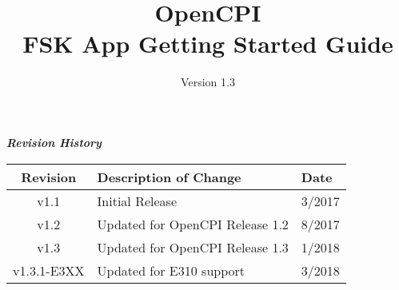 \iffalse
This file is protected by Copyright. Please refer to the COPYRIGHT file
distributed with this source distribution.

This file is part of OpenCPI <http://www.opencpi.org>

OpenCPI is free software: you can redistribute it and/or modify it under the
terms of the GNU Lesser General Public License as published by the Free Software
Foundation, either version 3 of the License, or (at your option) any later
version.

OpenCPI is distributed in the hope that it will be useful, but WITHOUT ANY
WARRANTY; without even the implied warranty of MERCHANTABILITY or FITNESS FOR A
PARTICULAR PURPOSE. See the GNU Lesser General Public License for more details.

You should have received a copy of the GNU Lesser General Public License along
with this program. If not, see <http://www.gnu.org/licenses/>.
\fi

\def\docTitle{OpenCPI\\ FSK App Getting Started Guide}
\def\docVersion{1.3}

\date{Version \docVersion} %
\title{\docTitle}
\usepackage[T1]{fontenc} %
\usepackage{graphicx}
\graphicspath{ {figures/} }
\usepackage{textcomp}

\maketitle
\newpage

	\begin{center}
	\textit{\textbf{Revision History}}
		\begin{table}[H]
		\label{table:revisions} %
			\begin{tabularx}{\textwidth}{|c|X|l|}
			\hline
			\rowcolor{blue}
			\textbf{Revision} & \textbf{Description of Change} & \textbf{Date} \\
		    \hline
		    v1.1 & Initial Release & 3/2017 \\
		    \hline
		    v1.2 & Updated for OpenCPI Release 1.2 & 8/2017 \\
			\hline
			v1.3 & Updated for OpenCPI Release 1.3 & 1/2018 \\
			\hline
			v1.3.1-E3XX & Updated for E310 support & 3/2018 \\
			\hline
			\end{tabularx}
		\end{table}
	\end{center}

